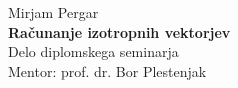 \documentclass[12pt,a4paper]{amsart}
\theoremstyle{definition}
\theoremstyle{plain}
\begin{document}
\thispagestyle{empty}
\vfill

\begin{center}{\large
Mirjam Pergar\\[2mm]
{\bf Računanje izotropnih vektorjev}\\[10mm]
Delo diplomskega seminarja\\[1cm]
Mentor: prof. dr. Bor Plestenjak}
\end{center}
\vfill

\pagebreak

\thispagestyle{empty}
\tableofcontents
\pagebreak
\end{document}
